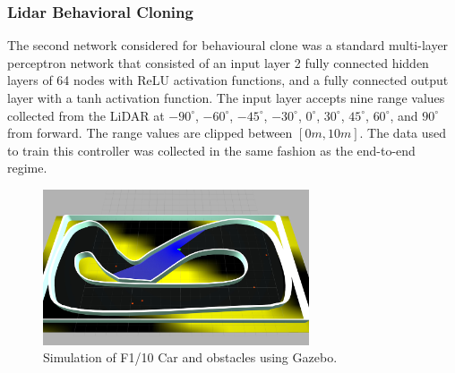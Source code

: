 \documentclass[manuscript,screen,review]{acmart}
\begin{document}
\subsubsection{Lidar Behavioral Cloning}
\label{sec:lidar cloning}
The second network considered for behavioural clone was a standard multi-layer perceptron network that consisted of an input layer 2 fully connected hidden layers of 64 nodes with ReLU activation functions, and a fully connected output layer with a tanh activation function. The input layer accepts nine range values collected from the LiDAR at $-90^{\circ}$, $-60^{\circ}$, $-45^{\circ}$, $-30^{\circ}$, $0^{\circ}$, $30^{\circ}$, $45^{\circ}$, $60^{\circ}$, and $90^{\circ}$ from forward. The range values are clipped between $[0m, 10m]$. The data used to train this controller was collected in the same fashion as the end-to-end regime. 





\begin{figure}[!htbp]
  \centering
    \includegraphics[width=0.7\textwidth]{figures/gazebo.jpg}
   \caption{Simulation of F1/10 Car and obstacles using Gazebo.}
  \label{fig:racetrack}
\end{figure}
\end{document}
